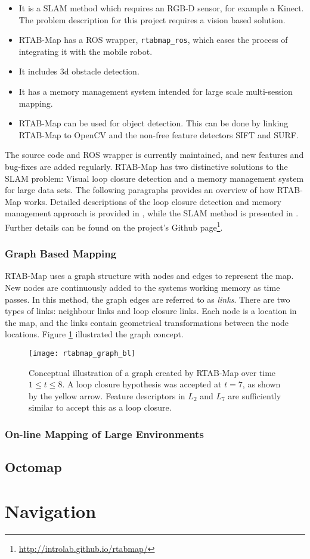 \begin{itemize}
	\item It is a \ac{SLAM} method which requires an RGB-D sensor, for example a Kinect. The problem description for this project requires a vision based solution.
	\item \ac{RTAB-Map} has a \ac{ROS} wrapper, \texttt{rtabmap\_ros}, which eases the process of integrating it with the mobile robot.
	\item It includes 3d obstacle detection.
	\item It has a memory management system intended for large scale multi-session mapping.
	\item \ac{RTAB-Map} can be used for object detection. This can be done by linking \ac{RTAB-Map} to OpenCV and the non-free feature detectors \ac{SIFT} and \ac{SURF}.
\end{itemize}

The source code and \ac{ROS} wrapper is currently maintained, and new features and bug-fixes are added regularly. \ac{RTAB-Map} has two distinctive solutions to the \ac{SLAM} problem: Visual loop closure detection and a memory management system for large data sets. The following paragraphs provides an overview of how \ac{RTAB-Map} works. Detailed descriptions of the loop closure detection and memory management approach is provided in  \cite{labbe13appearance}, while the \ac{SLAM} method is presented in \cite{labbe14online}. Further details can be found on the project's Github page\footnote{\url{http://introlab.github.io/rtabmap/}}.

\subsubsection{Graph Based Mapping}

\ac{RTAB-Map} uses a graph structure with nodes and edges to represent the map. New nodes are continuously added to the systems working memory as time passes. In this method, the graph edges are referred to as \textit{links}. There are two types of links: neighbour links and loop closure links. Each node is a location in the map, and the links contain geometrical transformations between the node locations. Figure \ref{fig:rtabmap_graph} illustrated the graph concept.

\begin{figure}[p]
    \centering
    \texttt{[image: rtabmap\_graph\_bl]}
    \caption{Conceptual illustration of a graph created by \ac{RTAB-Map} over time $1 \leq t \leq 8 $. A loop closure hypothesis was accepted at $t=7$, as shown by the yellow arrow. Feature descriptors in $L_2$ and $L_7$ are sufficiently similar to accept this as a loop closure.}
    \label{fig:rtabmap_graph}
\end{figure}

\subsubsection{On-line Mapping of Large Environments}



\subsection{Octomap}

\section{Navigation}
